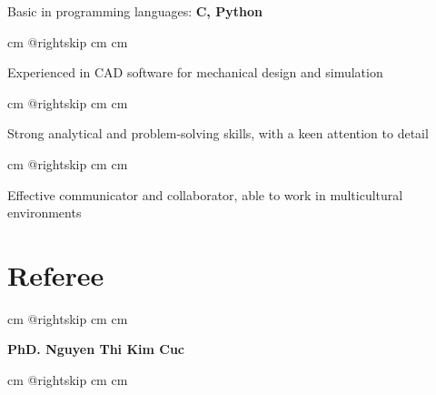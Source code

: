 \documentclass[10pt, letterpaper]{article}
\begin{document}
         Basic in programming languages: \textbf{C, Python} \par\endgroup

        \vspace{0.2 cm}
        \begingroup{} cm
        \advance\csname @rightskip cm
        \advance{} cm

        Experienced in CAD software for mechanical design and simulation \par\endgroup

        \vspace{0.2 cm}
        \begingroup{} cm
        \advance\csname @rightskip cm
        \advance{} cm

        Strong analytical and problem-solving skills, with a keen attention to detail \par\endgroup

        \vspace{0.2 cm}
        \begingroup{} cm
        \advance\csname @rightskip cm
        \advance{} cm

        Effective communicator and collaborator, able to work in multicultural environments \par\endgroup



    \section{Referee}

        \begingroup{} cm
        \advance\csname @rightskip cm
        \advance{} cm

        \textbf{PhD. Nguyen Thi Kim Cuc} \par\endgroup

        \vspace{0.2 cm}
        \begingroup{} cm
        \advance\csname @rightskip cm
        \advance{} cm
    
\end{document}
